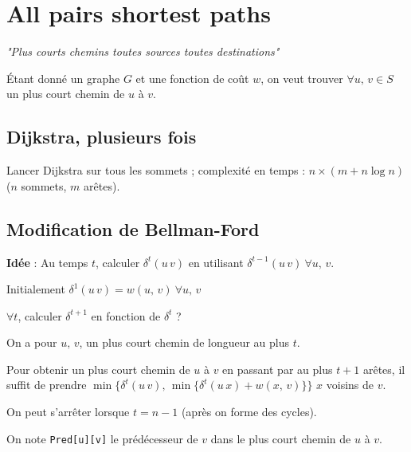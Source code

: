 \chapter{All pairs shortest paths}

\textit{"Plus courts chemins toutes sources toutes destinations"}

Étant donné un graphe $G$ et une fonction de coût $w$, on veut trouver $\forall u,\, v \in S$ un plus court chemin de $u$ à $v$.

\section{Dijkstra, plusieurs fois}
Lancer Dijkstra sur tous les sommets ; complexité en temps : $n \times (m + n \log n)$ ($n$ sommets, $m$ arêtes).

\section{Modification de Bellman-Ford}
\textbf{\textcolor{ocre}{Idée}} : Au temps $t$, calculer $\delta^{t}(u\, v)$ en utilisant $\delta^{t-1}(u\, v) \ \forall u,\, v$.

Initialement $\delta^{1}(u\, v) = w(u,\, v) \ \forall u,\, v$

$\forall t$, calculer $\delta^{t+1}$ en fonction de $\delta^{t}$ ?

On a pour $u,\, v$, un plus court chemin de longueur au plus $t$.

Pour obtenir un plus court chemin de $u$ à $v$ en passant par au plus $t + 1$ arêtes, il suffit de prendre $\min \lbrace \delta^{t}(u\, v),\, \min \lbrace \delta^{t}(u\, x) + w(x,\, v) \rbrace \rbrace$ $x$ voisins de $v$.

On peut s'arrêter lorsque $t = n-1$ (après on forme des cycles).

On note \texttt{Pred[u][v]} le prédécesseur de $v$ dans le plus court chemin de $u$ à $v$.

\begin{figure}[h]
	\centering
\end{figure}

